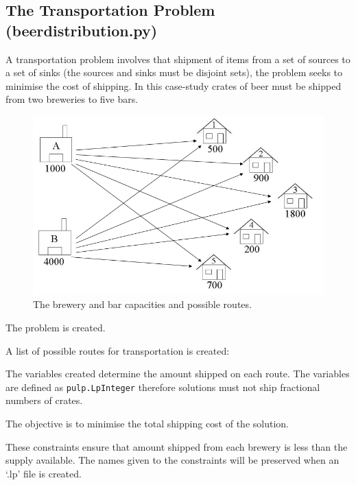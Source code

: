 \documentclass[a4paper,oneside]{arlimsTPPM}
\begin{document}
\subsection{The Transportation Problem (beerdistribution.py)}
A transportation problem involves that shipment of items from a set of sources 
to a set of sinks (the sources and sinks must be disjoint sets), the problem seeks 
to minimise the cost of shipping. In this case-study 
crates of beer must be shipped from two breweries to five bars.

\begin{figure}[h]
 \centering
 \includegraphics[scale = 0.3]{images/beerdistribution.png}
 \caption{The brewery and bar capacities and possible routes.}
\end{figure}


The problem is created.


A list of possible routes for transportation is created:


The variables created determine the amount shipped on each route. The variables
are defined as \lstinline{pulp.LpInteger} therefore solutions must not
ship fractional numbers of crates.


The objective is to minimise the total shipping cost of the solution.


These constraints ensure that amount shipped from each brewery is less 
than the supply available. The names given to the constraints will be preserved
when an `.lp' file is created.

\end{document}
